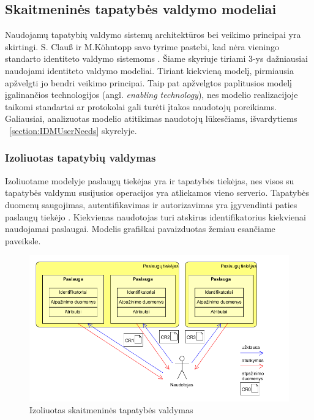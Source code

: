 \subsection{Skaitmeninės tapatybės valdymo modeliai}

Naudojamų tapatybių valdymo sistemų architektūros bei veikimo principai yra skirtingi. S. Clauß ir M.Köhntopp savo tyrime pastebi,
kad nėra vieningo standarto identiteto valdymo sistemoms \cite{Claus2001}. Šiame skyriuje tiriami 3-ys dažniausiai naudojami identiteto valdymo
modeliai. Tiriant kiekvieną modelį, pirmiausia apžvelgti jo bendri veikimo principai. Taip pat apžvelgtos paplitusios modelį įgalinančios technologijos
(angl. \textit{enabling technology}),
nes modelio realizacijoje taikomi standartai ar protokolai gali turėti įtakos naudotojų poreikiams. Galiausiai, analizuotas modelio atitikimas naudotojų lūkesčiams,
išvardytiems \hypertarget{section:IDMUserNeeds}{~\ref{section:IDMUserNeeds}} skyrelyje.

\subsubsection{Izoliuotas tapatybių valdymas}


Izoliuotame modelyje paslaugų tiekėjas yra ir tapatybės tiekėjas, nes visos su tapatybės valdymu
susijusios operacijos yra atliekamos vieno serverio. Tapatybės duomenų saugojimas, autentifikavimas
ir autorizavimas yra įgyvendinti paties paslaugų tiekėjo \cite{Cao2010}. Kiekvienas naudotojas turi atskirus identifikatorius
kiekvienai naudojamai paslaugai. Modelis grafiškai pavaizduotas žemiau esančiame paveiksle.

\begin{figure}[H]
    \centering
    \includegraphics[scale=0.65]{img/IsolatedModel}
    \caption{Izoliuotas skaitmeninės tapatybės valdymas \cite{Cao2010}}
\end{figure}

